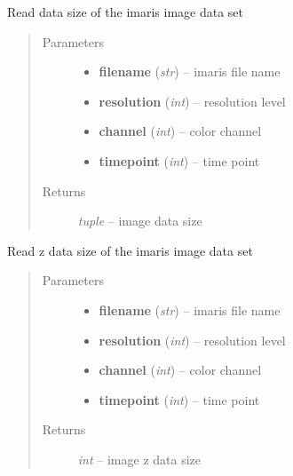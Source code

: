 \documentclass[letterpaper,10pt,english]{sphinxmanual}
\begin{document}
\begin{fulllineitems}
\label{api/ClearMap.IO:ClearMap.IO.Imaris.dataSize}
Read data size of the imaris image data set
\begin{quote}\begin{description}
\item[{Parameters}] \leavevmode\begin{itemize}
\item {} 
\textbf{filename} (\emph{str}) --
imaris file name

\item {} 
\textbf{resolution} (\emph{int}) --
resolution level

\item {} 
\textbf{channel} (\emph{int}) --
color channel

\item {} 
\textbf{timepoint} (\emph{int}) --
time point

\end{itemize}

\item[{Returns}] \leavevmode
\emph{tuple} --
image data size

\end{description}\end{quote}

\end{fulllineitems}


\begin{fulllineitems}
\label{api/ClearMap.IO:ClearMap.IO.Imaris.dataZSize}
Read z data size of the imaris image data set
\begin{quote}\begin{description}
\item[{Parameters}] \leavevmode\begin{itemize}
\item {} 
\textbf{filename} (\emph{str}) --
imaris file name

\item {} 
\textbf{resolution} (\emph{int}) --
resolution level

\item {} 
\textbf{channel} (\emph{int}) --
color channel

\item {} 
\textbf{timepoint} (\emph{int}) --
time point

\end{itemize}

\item[{Returns}] \leavevmode
\emph{int} --
image z data size

\end{description}\end{quote}

\end{fulllineitems}
\end{document}
